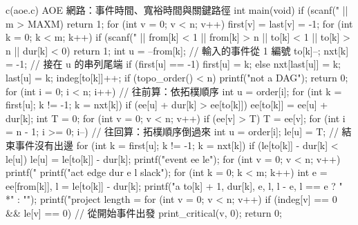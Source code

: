 \begin{example}[label=ex:tps-aoe]{c}{(aoe.c) AOE 網路：事件時間、寬裕時間與關鍵路徑}
int main(void)
{
    if (scanf("%
        || m > MAXM) {
        return 1;
    }
    for (int v = 0; v < n; v++) {
        first[v] = last[v] = -1;
    }
    for (int k = 0; k < m; k++) {
        if (scanf("%
            || from[k] < 1 || from[k] > n || to[k] < 1 || to[k] > n
            || dur[k] < 0) {
            return 1;
        }
        int u = --from[k];              // 輸入的事件從 1 編號
        to[k]--;
        nxt[k] = -1;                    // 接在 u 的串列尾端
        if (first[u] == -1) {
            first[u] = k;
        } else {
            nxt[last[u]] = k;
        }
        last[u] = k;
        indeg[to[k]]++;
    }
    if (topo_order() < n) {
        printf("not a DAG\n");
        return 0;
    }
    for (int i = 0; i < n; i++) {           // 往前算：依拓樸順序
        int u = order[i];
        for (int k = first[u]; k != -1; k = nxt[k]) {
            if (ee[u] + dur[k] > ee[to[k]]) {
                ee[to[k]] = ee[u] + dur[k];
            }
        }
    }
    int T = 0;
    for (int v = 0; v < n; v++) {
        if (ee[v] > T) {
            T = ee[v];
        }
    }
    for (int i = n - 1; i >= 0; i--) {      // 往回算：拓樸順序倒過來
        int u = order[i];
        le[u] = T;                          // 結束事件沒有出邊
        for (int k = first[u]; k != -1; k = nxt[k]) {
            if (le[to[k]] - dur[k] < le[u]) {
                le[u] = le[to[k]] - dur[k];
            }
        }
    }
    printf("event ee le\n");
    for (int v = 0; v < n; v++) {
        printf("%
    }
    printf("act edge dur e l slack\n");
    for (int k = 0; k < m; k++) {
        int e = ee[from[k]], l = le[to[k]] - dur[k];
        printf("a%
               to[k] + 1, dur[k], e, l, l - e, l == e ? " *" : "");
    }
    printf("project length = %
    for (int v = 0; v < n; v++) {
        if (indeg[v] == 0 && le[v] == 0) {  // 從開始事件出發
            print_critical(v, 0);
        }
    }
    return 0;
}
\end{example}
